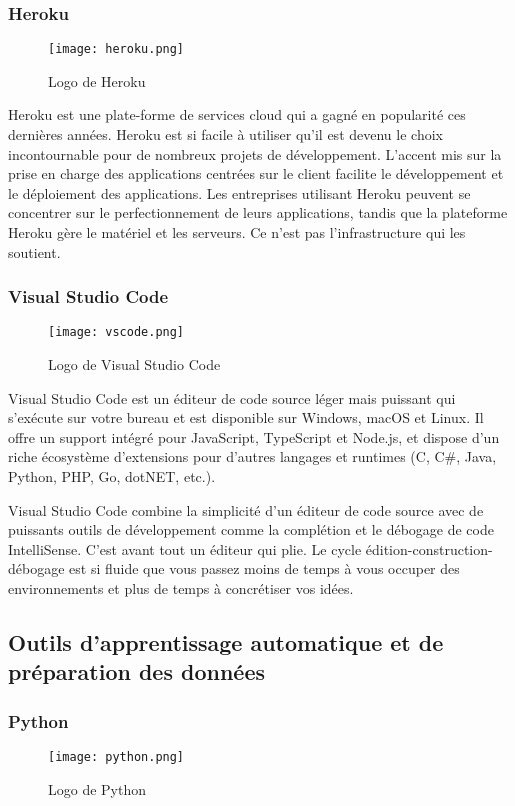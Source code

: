     \subsubsection{Heroku}
    \begin{figure}[H]
        \centering
        \texttt{[image: heroku.png]}
        \caption{Logo de Heroku}\label{fig:heroku}
    \end{figure}

    Heroku est une plate-forme de services cloud qui a gagné en popularité  ces dernières années. Heroku est si facile à utiliser qu'il est devenu le choix incontournable pour de nombreux projets de développement. 
    L'accent mis sur la prise en charge des applications centrées sur le client facilite le développement et le déploiement  des applications. Les entreprises utilisant Heroku peuvent se concentrer sur le perfectionnement de leurs applications, tandis que la plateforme Heroku gère le matériel et les serveurs. Ce n'est pas l'infrastructure qui les soutient.

    \subsubsection{Visual Studio Code}
    \begin{figure}[H]
        \centering
        \texttt{[image: vscode.png]}
        \caption{Logo de Visual Studio Code}\label{fig:vscode}
    \end{figure}
    Visual Studio Code est un éditeur de code source léger mais puissant qui s'exécute sur votre bureau et est disponible sur Windows, macOS et Linux. Il offre un support intégré pour JavaScript, TypeScript et Node.js, et dispose d'un riche écosystème d'extensions pour d'autres langages et runtimes (C, C\#, Java, Python, PHP, Go, dotNET, etc.).

    Visual Studio Code combine la simplicité d'un éditeur de code source avec de puissants outils de développement comme la complétion et le débogage de code IntelliSense. 
 C'est avant tout un éditeur qui plie. Le cycle édition-construction-débogage est si fluide que vous passez moins de temps à vous occuper des environnements et plus de temps à concrétiser vos idées.

    \subsection{Outils d'apprentissage automatique et de préparation des données}
    \subsubsection{Python}
    \begin{figure}[H]
        \centering
        \texttt{[image: python.png]}
        \caption{Logo de Python}\label{fig:python}
    \end{figure}

